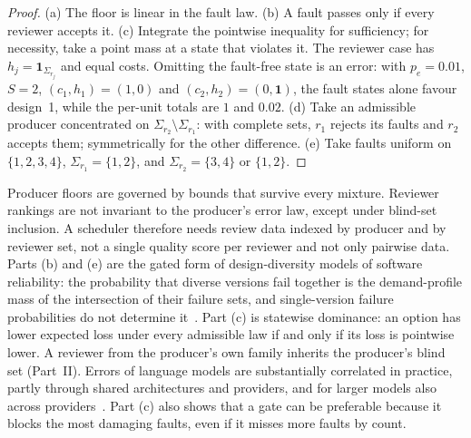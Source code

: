 \documentclass[11pt]{article}
\theoremstyle{definition}
\theoremstyle{remark}
\newcommand{\ind}{\mathbf 1}
\begin{document}
\begin{proof}
(a) The floor is linear in the fault law. (b) A fault passes only if every reviewer accepts it.
(c) Integrate the pointwise inequality for sufficiency; for necessity, take a point mass at a state
that violates it. The reviewer case has $h_j=\ind_{\Sigma_{r_j}}$ and equal costs. Omitting the fault-free
state is an error: with $p_e=0.01$, $S=2$, $(c_1,h_1)=(1,0)$ and $(c_2,h_2)=(0,\ind)$, the fault states
alone favour design~1, while the per-unit totals are $1$ and $0.02$. (d) Take an admissible producer concentrated on $\Sigma_{r_2}\setminus\Sigma_{r_1}$: with complete sets,
$r_1$ rejects its faults and $r_2$ accepts them; symmetrically for the other difference. (e) Take faults uniform on
$\{1,2,3,4\}$, $\Sigma_{r_1}=\{1,2\}$, and $\Sigma_{r_2}=\{3,4\}$ or $\{1,2\}$.
\end{proof}
Producer floors are governed by bounds that survive every mixture. Reviewer rankings are not
invariant to the producer's error law, except under blind-set inclusion. A scheduler therefore needs
review data indexed by producer and by reviewer set, not a single quality score per reviewer and not
only pairwise data. Parts (b) and (e) are the gated form of design-diversity models of software
reliability: the probability that diverse versions fail together is the demand-profile mass of the
intersection of their failure sets, and single-version failure probabilities do not determine
it~\cite{eckhardt85,littlewood89,lps01}. Part (c) is statewise dominance: an option has lower
expected loss under every admissible law if and only if its loss is pointwise lower. A reviewer from
the producer's own family inherits the producer's blind set (Part~II). Errors of language models are
substantially correlated in practice, partly through shared architectures and providers, and for
larger models also across providers~\cite{kim25}. Part (c) also shows that a gate can be preferable because it blocks the most damaging
faults, even if it misses more faults by count.
\end{document}
